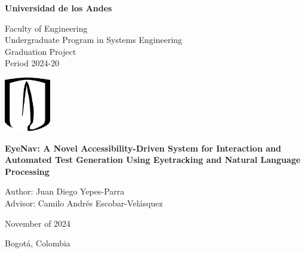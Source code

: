 \begin{titlepage}
\centering
{\bfseries\LARGE Universidad de los Andes \par}
\vspace{1cm}
{\Large Faculty of Engineering \\ Undergraduate Program in Systems Engineering \\ Graduation Project \\ Period 2024-20\par}
\vspace{2.0cm}
\includegraphics[width=0.15\textwidth]{images/Uniandes.png}\par
\vspace{2.0cm}
{\bfseries \LARGE EyeNav: A Novel Accessibility-Driven System for Interaction and Automated Test Generation Using Eyetracking and Natural Language Processing\par}
\vspace{2.0cm}
\vfill

\vfill
Author: Juan Diego Yepes-Parra \\
Advisor: Camilo Andrés Escobar-Velásquez
\par
\vfill
{ November of 2024 \par}
{ Bogotá, Colombia \par}
\end{titlepage}

\pagebreak